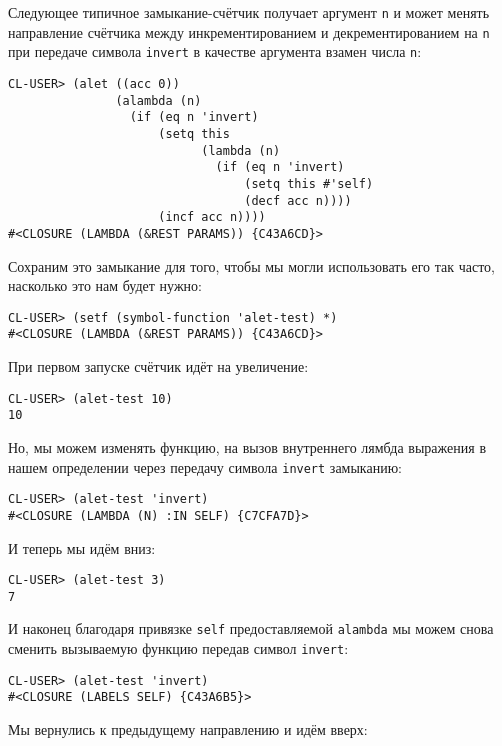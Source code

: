 Следующее типичное замыкание-счётчик получает аргумент \verb"n" и может менять направление счётчика между инкрементированием и декрементированием на \verb"n" при передаче символа \verb"invert" в качестве аргумента взамен числа \verb"n":

\begin{verbatim}
CL-USER> (alet ((acc 0))
               (alambda (n)
                 (if (eq n 'invert)
                     (setq this
                           (lambda (n)
                             (if (eq n 'invert)
                                 (setq this #'self)
                                 (decf acc n))))
                     (incf acc n))))
#<CLOSURE (LAMBDA (&REST PARAMS)) {C43A6CD}>
\end{verbatim}

Сохраним это замыкание для того, чтобы мы могли использовать его так часто, насколько это нам будет нужно:

\begin{verbatim}
CL-USER> (setf (symbol-function 'alet-test) *)
#<CLOSURE (LAMBDA (&REST PARAMS)) {C43A6CD}>
\end{verbatim}

При первом запуске счётчик идёт на увеличение:

\begin{verbatim}
CL-USER> (alet-test 10)
10
\end{verbatim}

Но, мы можем изменять функцию, на вызов внутреннего лямбда выражения в нашем определении через передачу символа \verb"invert" замыканию:

\begin{verbatim}
CL-USER> (alet-test 'invert)
#<CLOSURE (LAMBDA (N) :IN SELF) {C7CFA7D}>
\end{verbatim}

И теперь мы идём вниз:

\begin{verbatim}
CL-USER> (alet-test 3)
7
\end{verbatim}

И наконец благодаря привязке \verb"self" предоставляемой \verb"alambda" мы можем снова сменить вызываемую функцию передав символ \verb"invert":

\begin{verbatim}
CL-USER> (alet-test 'invert)
#<CLOSURE (LABELS SELF) {C43A6B5}>
\end{verbatim}

Мы вернулись к предыдущему направлению и идём вверх:

